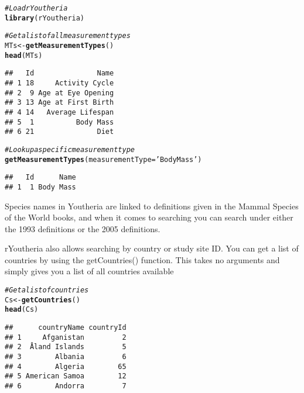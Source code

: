 \documentclass[a4paper]{article}\usepackage[]{graphicx}\usepackage[]{color}
\makeatletter
\newcommand{\hlstr}[1]{\textcolor[rgb]{0.192,0.494,0.8}{#1}}%
\newcommand{\hlcom}[1]{\textcolor[rgb]{0.678,0.584,0.686}{\textit{#1}}}%
\newcommand{\hlstd}[1]{\textcolor[rgb]{0.345,0.345,0.345}{#1}}%
\newcommand{\hlkwb}[1]{\textcolor[rgb]{0.69,0.353,0.396}{#1}}%
\newcommand{\hlkwc}[1]{\textcolor[rgb]{0.333,0.667,0.333}{#1}}%
\newcommand{\hlkwd}[1]{\textcolor[rgb]{0.737,0.353,0.396}{\textbf{#1}}}%
\newenvironment{kframe}{%
 \def\at@end@of@kframe{}%
 \ifinner\ifhmode%
  \def\at@end@of@kframe{\end{minipage}}%
  \begin{minipage}{\columnwidth}%
 \fi\fi%
 \def\FrameCommand##1{\hskip\@totalleftmargin \hskip-\fboxsep
 \colorbox{shadecolor}{##1}\hskip-\fboxsep
     \hskip-\linewidth \hskip-\@totalleftmargin \hskip\columnwidth}%
 \MakeFramed {\advance\hsize-\width
   \@totalleftmargin\z@ \linewidth\hsize
   \@setminipage}}%
 {\par\unskip\endMakeFramed%
 \at@end@of@kframe}
\newenvironment{knitrout}{}{} %
\makeatother
\begin{document}
\begin{knitrout}
\color{fgcolor}\begin{kframe}
\begin{alltt}
\hlcom{# Load rYoutheria}
\hlkwd{library}\hlstd{(rYoutheria)}

\hlcom{# Get a list of all measurement types}
\hlstd{MTs} \hlkwb{<-} \hlkwd{getMeasurementTypes}\hlstd{()}
\hlkwd{head}\hlstd{(MTs)}
\end{alltt}
\begin{verbatim}
##   Id               Name
## 1 18     Activity Cycle
## 2  9 Age at Eye Opening
## 3 13 Age at First Birth
## 4 14   Average Lifespan
## 5  1          Body Mass
## 6 21               Diet
\end{verbatim}
\begin{alltt}
\hlcom{# Look up a specific measurement type}
\hlkwd{getMeasurementTypes}\hlstd{(}\hlkwc{measurementType}\hlstd{=}\hlstr{'Body Mass'}\hlstd{)}
\end{alltt}
\begin{verbatim}
##   Id      Name
## 1  1 Body Mass
\end{verbatim}
\end{kframe}
\end{knitrout}

Species names in Youtheria are linked to definitions given in the Mammal Species of the World books, and when it comes to searching you can search under either the 1993 definitions or the 2005 definitions.

rYoutheria also allows searching by country or study site ID. You can get a list of countries by using the getCountries() function. This takes no arguments and simply gives you a list of all countries available

\begin{knitrout}
\color{fgcolor}\begin{kframe}
\begin{alltt}
\hlcom{# Get a list of countries}
\hlstd{Cs} \hlkwb{<-} \hlkwd{getCountries}\hlstd{()}
\hlkwd{head}\hlstd{(Cs)}
\end{alltt}
\begin{verbatim}
##      countryName countryId
## 1     Afganistan         2
## 2  Åland Islands         5
## 3        Albania         6
## 4        Algeria        65
## 5 American Samoa        12
## 6        Andorra         7
\end{verbatim}
\end{kframe}
\end{knitrout}
\end{document}
